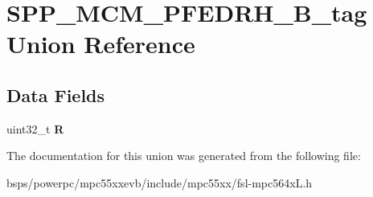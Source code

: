\hypertarget{unionSPP__MCM__PFEDRH__32B__tag}{}\section{S\+P\+P\+\_\+\+M\+C\+M\+\_\+\+P\+F\+E\+D\+R\+H\+\_\+B\+\_\+tag Union Reference}
\label{unionSPP__MCM__PFEDRH__32B__tag}
\subsection*{Data Fields}
\begin{DoxyCompactItemize}
\item 
\mbox{\label{unionSPP__MCM__PFEDRH__32B__tag_a99c63ede3dd377b743e14ec57d6cfa59}} 
uint32\+\_\+t {\bfseries R}
\end{DoxyCompactItemize}


The documentation for this union was generated from the following file\+:\begin{DoxyCompactItemize}
\item 
bsps/powerpc/mpc55xxevb/include/mpc55xx/fsl-\/mpc564x\+L.\+h\end{DoxyCompactItemize}
